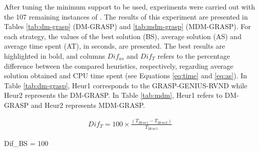 \documentclass{singlecol-new}
\begin{document}
After tuning the minimum support to be used, experiments were carried out with the 107 remaining instances of \citet{silva2009problema}. The results of this experiment are presented in Tables \ref{tab:dm-grasp} (DM-GRASP) and \ref{tab:mdm-grasp} (MDM-GRASP). For each strategy, the values of the best solution (BS),  average solution (AS) and average time spent (AT), in seconds,  are presented. The best results are highlighted in bold, and columns $Dif_{as}$ and $Dif_{T}$ refers to the percentage difference between the compared heuristics, respectively, regarding average solution obtained and CPU time spent (see Equations \ref{eq:time} and \ref{eq:as}). In Table \ref{tab:dm-grasp}, Heur1 corresponds to the GRASP-GENIUS-RVND while Heur2 represents the DM-GRASP. In Table \ref{tab:mdm}, Heur1 refers to DM-GRASP and Heur2 represents MDM-GRASP.


\begin{align}
Dif_{T} = 100 \times \frac{(T_{Heur1} - T_{Heur2})}{T_{Heur1}}
\label{eq:time}
\end{align}



	\begin{flalign}
	Dif_{BS} = 100 \times {}
\label{eq:as}
	\end{flalign}
\end{document}
